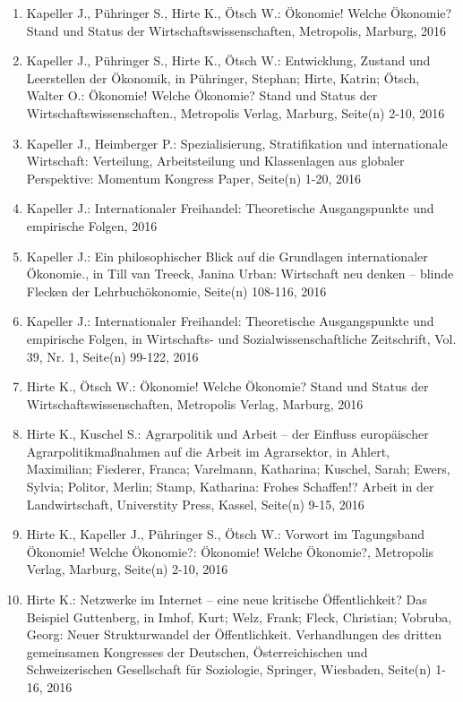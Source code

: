 \begin{enumerate}
	 \item Kapeller J., Pühringer S., Hirte K., Ötsch W.: Ökonomie! Welche Ökonomie? Stand und Status der Wirtschaftswissenschaften, Metropolis, Marburg, 2016
	 \item Kapeller J., Pühringer S., Hirte K., Ötsch W.: Entwicklung, Zustand und Leerstellen der Ökonomik, in Pühringer, Stephan; Hirte, Katrin; Ötsch, Walter O.: Ökonomie! Welche Ökonomie? Stand und Status der Wirtschaftswissenschaften., Metropolis Verlag, Marburg, Seite(n) 2-10, 2016
	 \item Kapeller J., Heimberger P.: Spezialisierung, Stratifikation und internationale Wirtschaft: Verteilung, Arbeitsteilung und Klassenlagen aus globaler Perspektive: Momentum Kongress Paper, Seite(n) 1-20, 2016
	 \item Kapeller J.: Internationaler Freihandel: Theoretische Ausgangspunkte und empirische Folgen, 2016
	 \item Kapeller J.: Ein philosophischer Blick auf die Grundlagen internationaler Ökonomie., in Till van Treeck, Janina Urban: Wirtschaft neu denken – blinde Flecken der Lehrbuchökonomie, Seite(n) 108-116, 2016
	 \item Kapeller J.: Internationaler Freihandel: Theoretische Ausgangspunkte und empirische Folgen, in Wirtschafts- und Sozialwissenschaftliche Zeitschrift, Vol. 39, Nr. 1, Seite(n) 99-122, 2016
	 \item Hirte K., Ötsch W.: Ökonomie! Welche Ökonomie? Stand und Status der Wirtschaftswissenschaften, Metropolis Verlag, Marburg, 2016
	 \item Hirte K., Kuschel S.: Agrarpolitik und Arbeit – der Einfluss europäischer Agrarpolitikmaßnahmen auf die Arbeit im Agrarsektor, in Ahlert, Maximilian; Fiederer, Franca; Varelmann, Katharina; Kuschel, Sarah; Ewers, Sylvia; Politor, Merlin; Stamp, Katharina: Frohes Schaffen!? Arbeit in der Landwirtschaft, Universtity Press, Kassel, Seite(n) 9-15, 2016
	 \item Hirte K., Kapeller J., Pühringer S., Ötsch W.: Vorwort im Tagungsband Ökonomie! Welche Ökonomie?: Ökonomie! Welche Ökonomie?, Metropolis Verlag, Marburg, Seite(n) 2-10, 2016
	 \item Hirte K.: Netzwerke im Internet – eine neue kritische Öffentlichkeit? Das Beispiel Guttenberg, in Imhof, Kurt; Welz, Frank; Fleck, Christian; Vobruba, Georg: Neuer Strukturwandel der Öffentlichkeit. Verhandlungen des dritten gemeinsamen Kongresses der Deutschen, Österreichischen und Schweizerischen Gesellschaft für Soziologie, Springer, Wiesbaden, Seite(n) 1-16, 2016

\end{enumerate}
